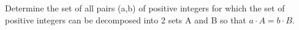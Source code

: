 Determine the set of all pairs (a,b) of positive integers for which the set of positive integers can be decomposed into 2 sets A and B so that \(a\cdot A=b\cdot B\).